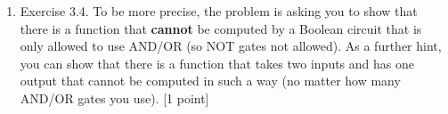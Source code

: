 \documentclass[11pt]{article}
\newcommand \kw[1]{\textbf{#1}}
\newenvironment{answer}{
\vspace{.5cm}
\kw{Answer}
}
{

}
\begin{document}
\begin{enumerate}
\begin{answer}
\qed
\end{answer}
\pagebreak

\item Exercise 3.4. To be more precise, the problem is asking you to show that there is a function that {\bf cannot} be computed by a Boolean circuit that is only allowed to use AND/OR (so NOT gates not allowed). As a further hint, you can show that there is a function that takes two inputs and has one output that cannot be computed in such a way (no matter how many AND/OR gates you use). [1 point]
\end{enumerate}
\end{document}
